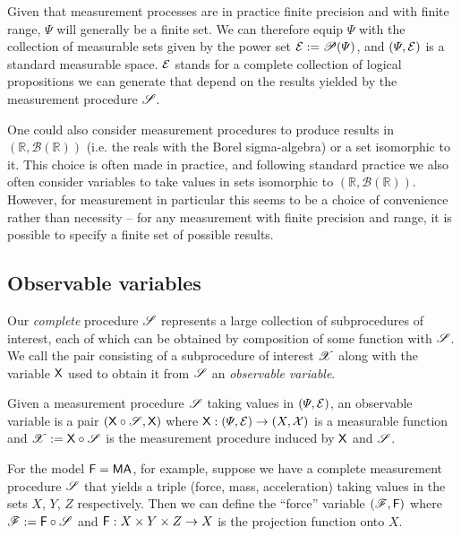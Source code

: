 Given that measurement processes are in practice finite precision and with finite range, $\Psi$ will generally be a finite set. We can therefore equip $\Psi$ with the collection of measurable sets given by the power set $\mathcal{E}:=\mathscr{P}(\Psi)$, and $(\Psi,\mathcal{E})$ is a standard measurable space. $\mathcal{E}$ stands for a complete collection of logical propositions we can generate that depend on the results yielded by the measurement procedure $\mathscr{S}$.

One could also consider measurement procedures to produce results in $(\mathbb{R},\mathcal{B}(\mathbb{R}))$ (i.e. the reals with the Borel sigma-algebra) or a set isomorphic to it. This choice is often made in practice, and following standard practice we also often consider variables to take values in sets isomorphic to $(\mathbb{R},\mathcal{B}(\mathbb{R}))$. However, for measurement in particular this seems to be a choice of convenience rather than necessity -- for any measurement with finite precision and range, it is possible to specify a finite set of possible results.

\subsection{Observable variables}

Our \emph{complete} procedure $\mathscr{S}$ represents a large collection of subprocedures of interest, each of which can be obtained by composition of some function with $\mathscr{S}$. We call the pair consisting of a subprocedure of interest $\mathscr{X}$ along with the variable $\mathsf{X}$ used to obtain it from $\mathscr{S}$ an \emph{observable variable}.

\begin{definition}
Given a measurement procedure $\mathscr{S}$ taking values in $(\Psi,\mathcal{E})$, an observable variable is a pair $(\mathsf{X}\circ \mathscr{S},\mathsf{X})$ where $\mathsf{X}:(\Psi,\mathcal{E})\to (X,\mathcal{X})$ is a measurable function and $\mathscr{X}:=\mathsf{X}\circ \mathscr{S}$ is the measurement procedure induced by $\mathsf{X}$ and $\mathscr{S}$.
\end{definition}

For the model $\mathsf{F}=\mathsf{MA}$, for example, suppose we have a complete measurement procedure $\mathscr{S}$ that yields a triple (force, mass, acceleration) taking values in the sets $X$, $Y$, $Z$ respectively. Then we can define the ``force'' variable $(\mathscr{F},\mathsf{F})$ where $\mathscr{F}:=\mathsf{F}\circ \mathscr{S}$ and $\mathsf{F}:X\times Y\times Z\to X$ is the projection function onto $X$.

